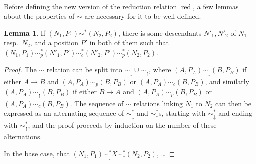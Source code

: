 \documentclass{article}
\DeclareMathOperator{\red}{red}
\theoremstyle{definition}
\theoremstyle{lemma}
\newtheorem{lemma}{Lemma}
\theoremstyle{remark}
\begin{document}
\paragraph{}
Before defining the new version of the reduction relation $\red$, a few lemmas about the properties of $\sim$ are necessary for it to be well-defined.

\begin{lemma} \label{downAcrossUp}
If $(N_1,P_1) \sim^* (N_2,P_2)$, there is some descendants $N'_1, N'_2$ of $N_1$ resp.~$N_2$, and a position $P'$ in both of them such that $(N_1,P_1) \sim_p^* (N'_1, P') \sim_c^* (N'_2, P') \sim_p^* (N_2, P_2)$.
\end{lemma}
\begin{proof}
The $\sim$ relation can be split into $\sim_\downarrow \cup \sim_\uparrow$, where $(A,P_A) \sim_\downarrow (B,P_B)$ if either $A \to B$ and $(A,P_A) \sim_p (B,P_B)$ or $(A,P_A) \sim_c (B,P_B)$, and similarly $(A,P_A) \sim_\uparrow (B,P_B)$ if either $B \to A$ and $(A,P_A) \sim_p (B,P_B)$ or $(A,P_A) \sim_c (B,P_B)$. The sequence of $\sim$ relations linking $N_1$ to $N_2$ can then be expressed as an alternating sequence of $\sim_\downarrow^*$ and $\sim_\uparrow^*$s, starting with $\sim_\downarrow^*$ and ending with $\sim_\uparrow^*$, and the proof proceeds by induction on the number of these alternations.

In the base case, that $(N_1,P_1) \sim_\downarrow^* X \sim_\uparrow^* (N_2,P_2)$, \dots

\end{proof}
\end{document}
